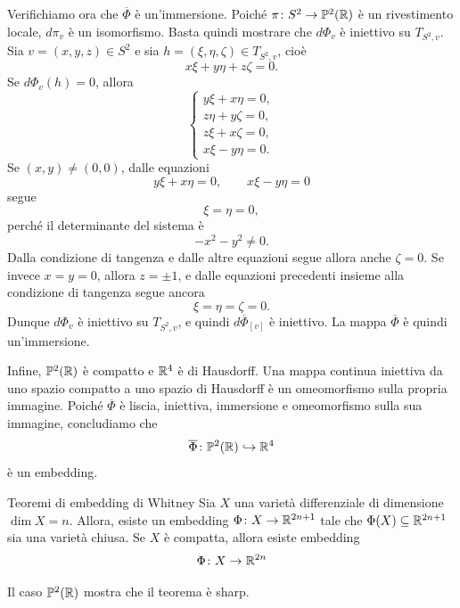 \documentclass[a4paper]{article}
\begin{document}
\begin{snippetproof}{}
    Verifichiamo ora che \(\overline\Phi\) è un'immersione. Poiché \(\pi\colon S^2\to\mathbb P^2(\mathbb{R})\) è un rivestimento locale, \(d\pi_v\) è un isomorfismo. Basta quindi mostrare che \(d\Phi_v\) è iniettivo su \(T_{S^2,v}\). Sia \(v=(x,y,z)\in S^2\) e sia \(h=(\xi,\eta,\zeta)\in T_{S^2,v}\), cioè
    \[
        x\xi+y\eta+z\zeta=0.
    \]
    Se \(d\Phi_v(h)=0\), allora
    \[
        \begin{cases}
            y\xi+x\eta=0,\\
            z\eta+y\zeta=0,\\
            z\xi+x\zeta=0,\\
            x\xi-y\eta=0.
        \end{cases}
    \]
    Se \((x,y)\neq(0,0)\), dalle equazioni
    \[
        y\xi+x\eta=0,
        \qquad
        x\xi-y\eta=0
    \]
    segue
    \[
        \xi=\eta=0,
    \]
    perché il determinante del sistema è
    \[
        -x^2-y^2\neq0.
    \]
    Dalla condizione di tangenza e dalle altre equazioni segue allora anche \(\zeta=0\). Se invece \(x=y=0\), allora \(z=\pm1\), e dalle equazioni precedenti insieme alla condizione di tangenza segue ancora
    \[
        \xi=\eta=\zeta=0.
    \]
    Dunque \(d\Phi_v\) è iniettivo su \(T_{S^2,v}\), e quindi \(d\overline\Phi_{[v]}\) è iniettivo. La mappa \(\overline\Phi\) è quindi un'immersione.

    Infine, \(\mathbb P^2(\mathbb{R})\) è compatto e \(\mathbb{R}^4\) è di Hausdorff. Una mappa continua iniettiva da uno spazio compatto a uno spazio di Hausdorff è un omeomorfismo sulla propria immagine. Poiché \(\overline\Phi\) è liscia, iniettiva, immersione e omeomorfismo sulla sua immagine, concludiamo che
    \[
        \overline\Phi\colon\mathbb P^2(\mathbb{R})\hookrightarrow\mathbb{R}^4
    \]
    è un embedding.
\end{snippetproof}

\begin{snippettheorem}{Teoremi di embedding di Whitney}
    Sia \(X\) una varietà differenziale di dimensione \(\dim X = n\).
    Allora, esiste un embedding \(\Phi \colon X \to \mathbb{R}^{2n+1}\)
    tale che \(\Phi(X) \subseteq \mathbb{R}^{2n+1}\) sia una varietà chiusa.
    Se \(X\) è compatta, allora esiste embedding
    \[
        \Phi \colon X \to \mathbb{R}^{2n}
    \]
\end{snippettheorem}

Il caso \(\mathbb P^2(\mathbb{R})\)
mostra che il teorema è sharp.
\end{document}

